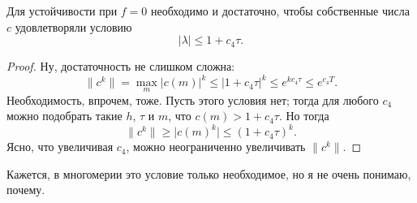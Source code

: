 \documentclass{trlnotes}
\begin{document}
    \begin{thm}
        Для устойчивости при $f = 0$ необходимо и достаточно, чтобы собственные числа $c$ удовлетворяли условию
        \[
            |\lambda| \leqslant 1 + c_4 \tau.
        \]
        \begin{proof}
            Ну, достаточность не слишком сложна:
            \[
                \|c^k\| = \max \limits_m \big|c(m)\big|^k \leqslant \big|1 + c_4 \tau\big|^k \leq e^{kc_4\tau} \leqslant e^{c_4 T}.
            \]
            Необходимость, впрочем, тоже. Пусть этого условия нет; тогда для любого $c_4$ можно подобрать такие $h$, $\tau$ и $m$, что $c(m) > 1 + c_4\tau$. Но тогда 
            \[
                \|c^k\| \geqslant \big|c(m)^k\big| \leqslant (1 + c_4 \tau)^k.
            \]
            Ясно, что увеличивая $c_4$, можно неограниченно увеличивать $\|c^k\|$.
        \end{proof}
    \end{thm}

    \begin{rem} 
        Кажется, в многомерии это условие только необходимое, но я не очень понимаю, почему.
    \end{rem}
\end{document}

